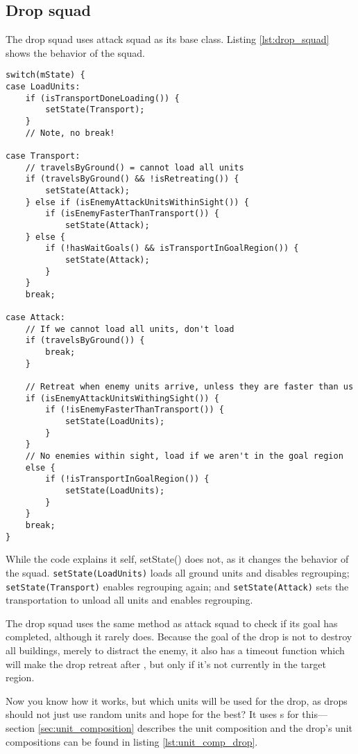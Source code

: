 \subsection{Drop squad}
\label{sec:drop_squad}
The drop squad uses attack squad as its base class. Listing \ref{lst:drop_squad} shows the behavior of the squad.
\begin{lstlisting}[caption={Drop squad behavior},label={lst:drop_squad}]
switch(mState) {
case LoadUnits:
	if (isTransportDoneLoading()) {
		setState(Transport);
	}
	// Note, no break!

case Transport:
	// travelsByGround() = cannot load all units
	if (travelsByGround() && !isRetreating()) {
		setState(Attack);
	} else if (isEnemyAttackUnitsWithinSight()) {
		if (isEnemyFasterThanTransport()) {
			setState(Attack);
	} else {
		if (!hasWaitGoals() && isTransportInGoalRegion()) {
			setState(Attack);
		}
	}
	break;

case Attack:
	// If we cannot load all units, don't load
	if (travelsByGround()) {
		break;
	}

	// Retreat when enemy units arrive, unless they are faster than us
	if (isEnemyAttackUnitsWithingSight()) {
		if (!isEnemyFasterThanTransport()) {
			setState(LoadUnits);
		}
	}
	// No enemies within sight, load if we aren't in the goal region
	else {
		if (!isTransportInGoalRegion()) {
			setState(LoadUnits);
		}
	}
	break;
}
\end{lstlisting}
While the code explains it self, setState() does not, as it changes the behavior of the squad. \texttt{setState(LoadUnits)} loads all ground units and disables regrouping; \texttt{setState(Transport)} enables regrouping again; and \texttt{setState(Attack)} sets the transportation to unload all units and enables regrouping.

The drop squad uses the same method as attack squad to check if its goal has completed, although it rarely does. Because the goal of the drop is not to destroy all buildings, merely to distract the enemy, it also has a timeout function which will make the drop retreat after \squadDropAttackTimeout, but only if it's not currently in the target region.

Now you know how it works, but which units will be used for the drop, as drops should not just use random units and hope for the best? It uses s for this—section \ref{sec:unit_composition} describes the unit composition and the drop's unit compositions can be found in listing \ref{lst:unit_comp_drop}. 

